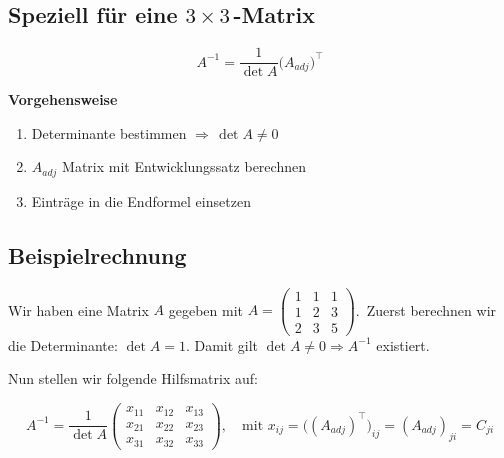 \documentclass[a4paper,11pt,oneside,open=any,parskip=half, DIV=15]{scrreprt}
\begin{document}
   \subsection*{Speziell für eine \texorpdfstring{\(3\times 3\)\,-Matrix}{3x3-Matrix}}

         \begin{importantbox}
      \[
            A^{-1} = \frac{1}{\det A} \big( A_{adj} \big)^{\top}
      \]
      \end{importantbox}

      \noindent

      \vspace{1em}

      \textbf{Vorgehensweise}
      \begin{enumerate}

            \item Determinante bestimmen \( \Rightarrow \, \det A \neq 0 \) 

            \item \( A_{adj} \) Matrix mit Entwicklungssatz berechnen
            
            \item Einträge in die Endformel einsetzen

      \end{enumerate}

   \subsection*{Beispielrechnung}

      Wir haben eine Matrix \( A \) gegeben mit \( A = \begin{pmatrix} 1 & 1 & 1 \\ 1 & 2 & 3 \\ 2 & 3 & 5 \end{pmatrix}\).\,
      Zuerst berechnen wir die Determinante: \(\det A=1\). Damit gilt \(\det A\neq 0 \Rightarrow A^{-1}\) existiert.

      Nun stellen wir folgende Hilfsmatrix auf:
      \begin{importantbox} 
            \[ 
               A^{-1}=\frac{1}{\det A}
               \begin{pmatrix}
                  x_{11} & x_{12} & x_{13} \\
                  x_{21} & x_{22} & x_{23} \\
                  x_{31} & x_{32} & x_{33}
               \end{pmatrix}, \quad\text{mit }x_{ij}=\big((A_{adj})^{\top}\big)_{ij}=(A_{adj})_{ji}=C_{ji}
            \] 
      \end{importantbox}
\end{document}
